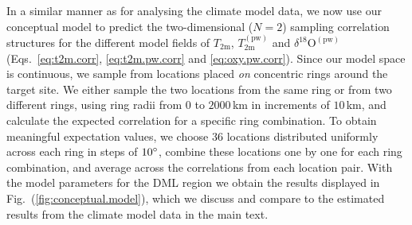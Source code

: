 \documentclass[cp, manuscript]{copernicus}
\begin{document}
In a similar manner as for analysing the climate model data, we now use our
conceptual model to predict the two-dimensional ($N=2$) sampling correlation
structures for the different model fields of $T_{\mathrm{2m}}$,
$T_{\mathrm{2m}}^{\mathrm{(pw)}}$ and $\delta^{18}\mathrm{O}^{\mathrm{(pw)}}$
(Eqs.~\ref{eq:t2m.corr}, \ref{eq:t2m.pw.corr} and \ref{eq:oxy.pw.corr}). Since
our model space is continuous, we sample from locations placed \emph{on}
concentric rings around the target site. We either sample the two locations from
the same ring or from two different rings, using ring radii from $0$ to
$2000$\,km in increments of $10$\,km, and calculate the expected correlation for
a specific ring combination. To obtain meaningful expectation values, we choose
$36$ locations distributed uniformly across each ring in steps of $10^{\circ}$,
combine these locations one by one for each ring combination, and average across
the correlations from each location pair. With the model parameters for the DML
region we obtain the results displayed in Fig.~(\ref{fig:conceptual.model}),
which we discuss and compare to the estimated results from the climate model
data in the main text.

\noappendix





\end{document}
